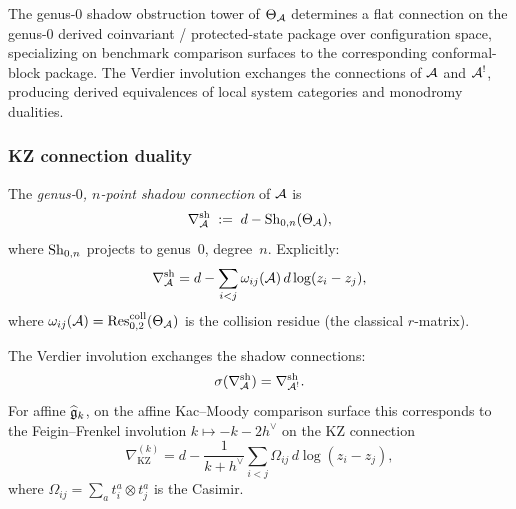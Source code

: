 The genus-$0$ shadow obstruction tower of $\Theta_{\mathcal{A}}$ determines a flat connection
on the genus-$0$ derived coinvariant / protected-state package over
configuration space, specializing on benchmark comparison surfaces to
the corresponding conformal-block package. The Verdier
involution exchanges the connections of $\mathcal{A}$ and $\mathcal{A}^!$, producing
derived equivalences of local system categories and monodromy dualities.

\subsubsection{KZ connection duality}

\begin{definition}
\label{def:thqg-IV-shadow-connection}
The \emph{genus-$0$, $n$-point shadow connection} of $\mathcal{A}$ is
\begin{equation}\label{eq:thqg-IV-shadow-connection}
\nabla^{\mathrm{sh}}_{\mathcal{A}}
\;:=\;
d - \mathrm{Sh}_{0,n}(\Theta_{\mathcal{A}}),
\end{equation}
where $\mathrm{Sh}_{0,n}$ projects to genus~$0$, degree~$n$. Explicitly:
\begin{equation}\label{eq:thqg-IV-shadow-connection-explicit}
\nabla^{\mathrm{sh}}_{\mathcal{A}}
= d - \sum_{i < j} \omega_{ij}(\mathcal{A})\, d\log(z_i - z_j),
\end{equation}
where $\omega_{ij}(\mathcal{A}) = \operatorname{Res}^{\mathrm{coll}}_{0,2}(\Theta_{\mathcal{A}})$
is the collision residue (the classical $r$-matrix).
\end{definition}

\begin{theorem}
\label{thm:thqg-IV-kz-duality}
The Verdier involution exchanges the shadow connections:
\begin{equation}\label{eq:thqg-IV-kz-duality}
\sigma(\nabla^{\mathrm{sh}}_{\mathcal{A}}) = \nabla^{\mathrm{sh}}_{\mathcal{A}^!}.
\end{equation}
For affine $\widehat{\mathfrak{g}}_k$, on the affine Kac--Moody comparison
surface this corresponds to the Feigin--Frenkel involution
$k \mapsto -k - 2h^\vee$ on the KZ connection
\[
\nabla_{\mathrm{KZ}}^{(k)}
= d - \frac{1}{k + h^\vee}
\sum_{i < j} \Omega_{ij}\, d\log(z_i - z_j),
\]
where $\Omega_{ij} = \sum_a t^a_i \otimes t^a_j$ is the Casimir.
\end{theorem}

